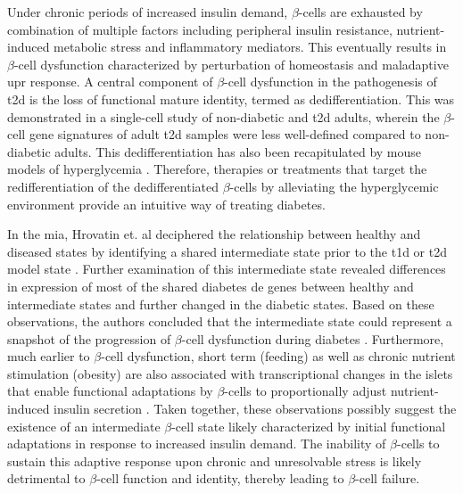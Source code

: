 \par Under chronic periods of increased insulin demand, $\beta$-cells are exhausted by combination of multiple factors including peripheral insulin resistance, nutrient-induced metabolic stress and inflammatory mediators. This eventually results in $\beta$-cell dysfunction characterized by perturbation of  homeostasis and maladaptive \gls{upr} response. A central component of $\beta$-cell dysfunction in the pathogenesis of \gls{t2d} is the loss of functional mature identity, termed as dedifferentiation. This was demonstrated in a single-cell study of non-diabetic and \gls{t2d} adults, wherein the $\beta$-cell gene signatures of adult \gls{t2d} samples were less well-defined compared to non-diabetic adults. This dedifferentiation has also been recapitulated by mouse models of hyperglycemia \textbf{\cite{sachs_targeted_2020,oppenlander_vertical_2021}}. Therefore, therapies or treatments that target the redifferentiation of the dedifferentiated $\beta$-cells by alleviating the hyperglycemic environment provide an intuitive way of treating diabetes.\\
\par In the \gls{mia}, Hrovatin et. al deciphered the relationship between healthy and diseased states by identifying a shared intermediate state prior to the \gls{t1d} or \gls{t2d} model state \textbf{\cite{hrovatin_delineating_2023}}. Further examination of this intermediate state revealed differences in expression of most of the shared diabetes \gls{de} genes between healthy and intermediate states and further changed in the diabetic states. Based on these observations, the authors concluded that the intermediate state could represent a snapshot of the progression of $\beta$-cell dysfunction during diabetes \textbf{\cite{hrovatin_delineating_2023}}. Furthermore, much earlier to $\beta$-cell dysfunction, short term (feeding) as well as chronic nutrient stimulation (obesity) are also associated with transcriptional changes in the islets that enable functional adaptations by $\beta$-cells to proportionally adjust nutrient-induced insulin secretion \textbf{\cite{wortham_nutrient_2023}}. Taken together, these observations possibly suggest the existence of an intermediate $\beta$-cell state likely characterized by initial functional adaptations in response to increased insulin demand. The inability of $\beta$-cells to sustain this adaptive response upon chronic and unresolvable stress is likely detrimental to $\beta$-cell function and identity, thereby leading to $\beta$-cell failure.\\



